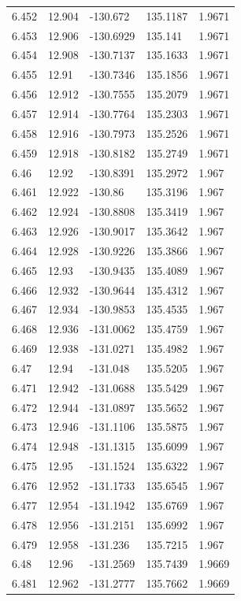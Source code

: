 \begin{tabular}{lllll}
6.452 & 12.904 & -130.672 & 135.1187 & 1.9671 \\
6.453 & 12.906 & -130.6929 & 135.141 & 1.9671 \\
6.454 & 12.908 & -130.7137 & 135.1633 & 1.9671 \\
6.455 & 12.91 & -130.7346 & 135.1856 & 1.9671 \\
6.456 & 12.912 & -130.7555 & 135.2079 & 1.9671 \\
6.457 & 12.914 & -130.7764 & 135.2303 & 1.9671 \\
6.458 & 12.916 & -130.7973 & 135.2526 & 1.9671 \\
6.459 & 12.918 & -130.8182 & 135.2749 & 1.9671 \\
6.46 & 12.92 & -130.8391 & 135.2972 & 1.967 \\
6.461 & 12.922 & -130.86 & 135.3196 & 1.967 \\
6.462 & 12.924 & -130.8808 & 135.3419 & 1.967 \\
6.463 & 12.926 & -130.9017 & 135.3642 & 1.967 \\
6.464 & 12.928 & -130.9226 & 135.3866 & 1.967 \\
6.465 & 12.93 & -130.9435 & 135.4089 & 1.967 \\
6.466 & 12.932 & -130.9644 & 135.4312 & 1.967 \\
6.467 & 12.934 & -130.9853 & 135.4535 & 1.967 \\
6.468 & 12.936 & -131.0062 & 135.4759 & 1.967 \\
6.469 & 12.938 & -131.0271 & 135.4982 & 1.967 \\
6.47 & 12.94 & -131.048 & 135.5205 & 1.967 \\
6.471 & 12.942 & -131.0688 & 135.5429 & 1.967 \\
6.472 & 12.944 & -131.0897 & 135.5652 & 1.967 \\
6.473 & 12.946 & -131.1106 & 135.5875 & 1.967 \\
6.474 & 12.948 & -131.1315 & 135.6099 & 1.967 \\
6.475 & 12.95 & -131.1524 & 135.6322 & 1.967 \\
6.476 & 12.952 & -131.1733 & 135.6545 & 1.967 \\
6.477 & 12.954 & -131.1942 & 135.6769 & 1.967 \\
6.478 & 12.956 & -131.2151 & 135.6992 & 1.967 \\
6.479 & 12.958 & -131.236 & 135.7215 & 1.967 \\
6.48 & 12.96 & -131.2569 & 135.7439 & 1.9669 \\
6.481 & 12.962 & -131.2777 & 135.7662 & 1.9669 \\

\end{tabular}

